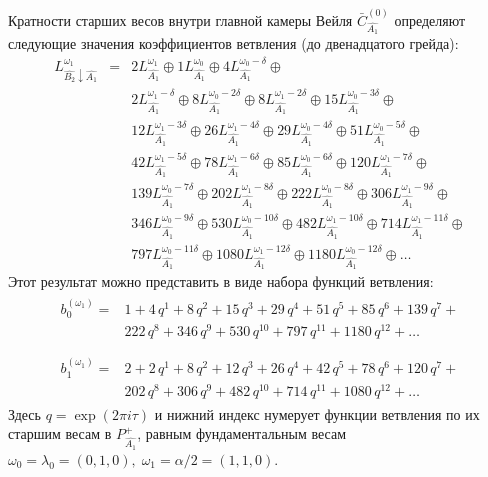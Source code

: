 Кратности старших весов внутри главной камеры Вейля
$\bar{C}^{\left( 0 \right)}_{\hat{A_1}}$ определяют следующие значения коэффициентов ветвления (до двенадцатого грейда):
\begin{eqnarray*}
  \label{eq:28}
  L^{\omega_1}_{\hat{B_2}\downarrow \hat{A_1}}
  &=&2 L_{\hat{A_1}}^{\omega_1}\oplus 1 L_{\hat{A_1}}^{\omega_0}\oplus 4 L_{\hat{A_1}}^{\omega_0-\delta}\oplus\\
    &&2 L_{\hat{A_1}}^{\omega_1-\delta}\oplus 8 L_{\hat{A_1}}^{\omega_0-2\delta}\oplus
    8 L_{\hat{A_1}}^{\omega_1-2\delta}\oplus 15 L_{\hat{A_1}}^{\omega_0-3\delta}\oplus\\
    &&12 L_{\hat{A_1}}^{\omega_1-3\delta}\oplus 26 L_{\hat{A_1}}^{\omega_1-4\delta}\oplus
    29 L_{\hat{A_1}}^{\omega_0-4\delta}\oplus 51 L_{\hat{A_1}}^{\omega_0-5\delta}\oplus\\
    &&42 L_{\hat{A_1}}^{\omega_1-5\delta}\oplus 78 L_{\hat{A_1}}^{\omega_1-6\delta}\oplus
    85 L_{\hat{A_1}}^{\omega_0-6\delta}\oplus 120 L_{\hat{A_1}}^{\omega_1-7\delta}\oplus\\
    &&139 L_{\hat{A_1}}^{\omega_0-7\delta}\oplus 202 L_{\hat{A_1}}^{\omega_1-8\delta}\oplus
    222 L_{\hat{A_1}}^{\omega_0-8\delta}\oplus 306 L_{\hat{A_1}}^{\omega_1-9\delta}\oplus\\
    &&346 L_{\hat{A_1}}^{\omega_0-9\delta}\oplus 530 L_{\hat{A_1}}^{\omega_0-10\delta}\oplus
    482 L_{\hat{A_1}}^{\omega_1-10\delta}\oplus 714 L_{\hat{A_1}}^{\omega_1-11\delta}\oplus\\
    &&797 L_{\hat{A_1}}^{\omega_0-11\delta}\oplus 1080 L_{\hat{A_1}}^{\omega_1-12\delta}\oplus
    1180 L_{\hat{A_1}}^{\omega_0-12\delta}\oplus \dots
\end{eqnarray*}
Этот результат можно представить в виде набора функций ветвления:
\begin{eqnarray*}
  \label{eq:29}
  \begin{array}{cc}
    b^{(\omega_1)}_{0}= & 1 + 4\,q^{1}+ 8\,q^{2}+ 15\,q^{3}+ 29\,q^{4}+ 51\,q^{5}+ 85\,q^{6}+ 139\,q^{7}+\\
     &222\,q^{8}+ 346\,q^{9}+ 530\,q^{10}+ 797\,q^{11}+ 1180\,q^{12}+\dots\\
  \end{array}\\
  \begin{array}{cc}
    b^{(\omega_1)}_{1}= &2+2\,q^{1}+8\,q^{2}+12\,q^{3}+26\,q^{4}+42\,q^{5}+78\,q^{6}+120\,q^{7}+\\
    & 202\,q^{8}+306\,q^{9}+482\,q^{10}+714\,q^{11}+1080\,q^{12}+\dots
  \end{array}
\end{eqnarray*}
Здесь $q=\exp (2\pi i \tau)$ и нижний индекс нумерует функции ветвления по их старшим весам в  $P^+_{\hat{A_1}}$, равным фундаментальным весам $\omega_0=\lambda_0=(0,1,0),\; \omega_1=\alpha/2=(1,1,0)$.

